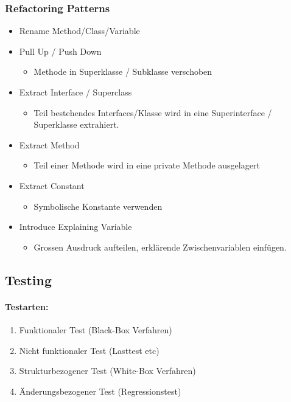 \documentclass[../ZF_SWEN1.tex]{subfiles}
\begin{document}
\subsubsection{Refactoring Patterns}
\begin{itemize}
	\item Rename Method/Class/Variable
	\item Pull Up / Push Down
	\begin{itemize}
		\item Methode in Superklasse / Subklasse verschoben
	\end{itemize}
	\item Extract Interface / Superclass
	\begin{itemize}
		\item Teil bestehendes Interfaces/Klasse wird in eine Superinterface / Superklasse extrahiert.
	\end{itemize}
	\item Extract Method
	\begin{itemize}
		\item Teil einer Methode wird in eine private Methode ausgelagert
	\end{itemize}
	\item Extract Constant
	\begin{itemize}
		\item Symbolische Konstante verwenden
	\end{itemize}
	\item Introduce Explaining Variable
	\begin{itemize}
		\item Grossen Ausdruck aufteilen, erklärende Zwischenvariablen einfügen.
	\end{itemize}
\end{itemize}


\subsection{Testing}
\paragraph{Testarten:}
\begin{enumerate}
	\item Funktionaler Test (Black-Box Verfahren)
	\item Nicht funktionaler Test (Lasttest etc)
	\item Strukturbezogener Test (White-Box Verfahren)
	\item Änderungsbezogener Test (Regressionstest)
\end{enumerate}
\end{document}
